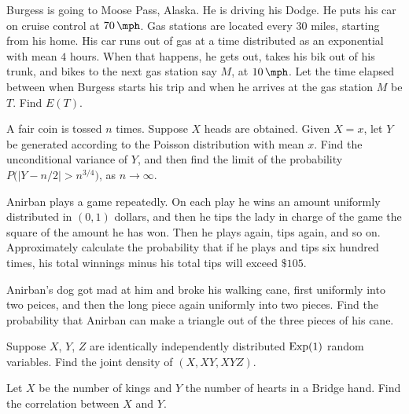 \begin{problem}
  Burgess is going to Moose Pass, Alaska. He is driving his Dodge. He puts
  his car on cruise control at \(\SI{70}{\mph}\). Gas stations are located
  every \(30\) miles, starting from his home. His car runs out of gas at a
  time distributed as an exponential with mean \(4\) hours. When that
  happens, he gets out, takes his bik out of his trunk, and bikes to the
  next gas station say \(M\), at \(\SI{10}{\mph}\). Let the time elapsed
  between when Burgess starts his trip and when he arrives at the gas
  station \(M\) be \(T\). Find \(E(T)\).
\end{problem}
\begin{solution*}
\end{solution*}

\begin{problem}
  A fair coin is tossed \(n\) times. Suppose \(X\) heads are
  obtained. Given \(X=x\), let \(Y\) be generated according to the Poisson
  distribution with mean \(x\). Find the unconditional variance of \(Y\),
  and then find the limit of the probability
  \(P\bigl(|Y-n/2|>n^{3/4}\bigr)\), as \(n\to\infty\).
\end{problem}
\begin{solution*}
\end{solution*}

\begin{problem}
  Anirban plays a game repeatedly. On each play he wins an amount uniformly
  distributed in \((0,1)\) dollars, and then he tips the lady in charge of the
  game the square of the amount he has won. Then he plays again, tips
  again, and so on. Approximately calculate the probability that if he
  plays and tips six hundred times, his total winnings minus his total tips
  will exceed \(\$105\).
\end{problem}
\begin{solution*}
\end{solution*}

\begin{problem}
  Anirban's dog got mad at him and broke his walking cane, first uniformly
  into two peices, and then the long piece again uniformly into two
  pieces. Find the probability that Anirban can make a triangle out of the
  three pieces of his cane.
\end{problem}
\begin{solution*}
\end{solution*}

\begin{problem}
  Suppose \(X\), \(Y\), \(Z\) are identically independently distributed
  \(\operatorname{Exp}(1)\) random variables. Find the joint density of \((X,XY,XYZ)\).
\end{problem}
\begin{solution*}
\end{solution*}

\begin{problem}
  Let \(X\) be the number of kings and \(Y\) the number of hearts in a
  Bridge hand. Find the correlation between \(X\) and \(Y\).
\end{problem}
\begin{solution*}
\end{solution*}

